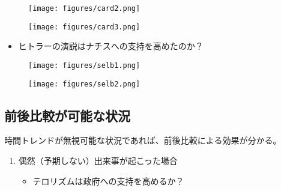 \documentclass[
  xelatex,
  ja=standard]{bxjsarticle}
\providecommand{\tightlist}{%
  \setlength{\itemsep}{0pt}\setlength{\parskip}{0pt}}\usepackage{longtable,booktabs,array}
\begin{document}
\begin{figure}[htpb]

{\centering \texttt{[image: figures/card2.png]}

}

\caption{\citet{card1990}}

\end{figure}

\begin{figure}[htpb]

{\centering \texttt{[image: figures/card3.png]}

}

\caption{\citet{card1990}}

\end{figure}

\begin{itemize}
\tightlist
\item
  ヒトラーの演説はナチスへの支持を高めたのか？
\end{itemize}

\begin{figure}[htpb]

{\centering \texttt{[image: figures/selb1.png]}

}

\caption{\citet{selb2018}}

\end{figure}

\begin{figure}[htpb]

{\centering \texttt{[image: figures/selb2.png]}

}

\caption{\citet{selb2018}}

\end{figure}

\hypertarget{ux524dux5f8cux6bd4ux8f03ux304cux53efux80fdux306aux72b6ux6cc1}{%
\subsection{前後比較が可能な状況}\label{ux524dux5f8cux6bd4ux8f03ux304cux53efux80fdux306aux72b6ux6cc1}}

時間トレンドが無視可能な状況であれば、前後比較による効果が分かる。

\begin{enumerate}
\def\labelenumi{\arabic{enumi}.}
\tightlist
\item
  偶然（予期しない）出来事が起こった場合

  \begin{itemize}
  \tightlist
  \item
    テロリズムは政府への支持を高めるか？
  \end{itemize}
\end{enumerate}
\end{document}
